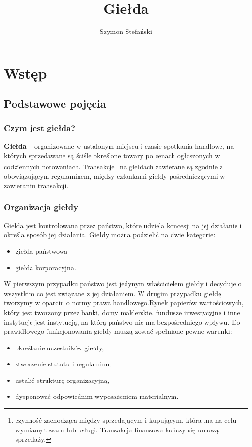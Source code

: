 \documentclass{report}
\title{Giełda}
\author{Szymon Stefański}
\begin{document}
\maketitle
\tableofcontents
\newpage
\chapter{Wstęp}
\section{Podstawowe pojęcia}
\subsection{Czym jest giełda?}
\textbf{Giełda}\cite{gielda} – organizowane w ustalonym miejscu i czasie spotkania handlowe, na których sprzedawane są ściśle określone towary po cenach ogłoszonych w codziennych notowaniach. Transakcje\footnote{ czynność zachodząca między sprzedającym i kupującym, która ma na celu wymianę towaru lub usługi. Transakcja finansowa kończy się umową sprzedaży. } na giełdach zawierane są zgodnie z obowiązującym regulaminem, między członkami giełdy pośredniczącymi w zawieraniu transakcji.
\subsection{Organizacja giełdy}
Giełda jest kontrolowana przez państwo, które udziela koncesji na jej działanie i określa sposób jej działania.
Giełdy można podzielić na dwie kategorie:
\begin{itemize}
\item giełda państwowa
\item giełda korporacyjna.
\end{itemize}
W pierwszym przypadku państwo jest jedynym właścicielem giełdy i decyduje o wszystkim co jest związane z jej działaniem. W drugim przypadku giełdę tworzymy w oparciu o normy prawa handlowego.Rynek papierów wartościowych, który jest tworzony przez banki, domy maklerskie, fundusze inwestycyjne i inne instytucje jest instytucją, na którą państwo nie ma bezpośredniego wpływu.
\newline Do prawidłowego funkcjonowania giełdy muszą zostać spełnione pewne warunki:
\begin{itemize}
\item określanie uczestników giełdy,
\item stworzenie statutu i regulaminu,
\item ustalić strukturę organizacyjną,
\item dysponować odpowiednim wyposażeniem materialnym.
\end{itemize}
\end{document}
